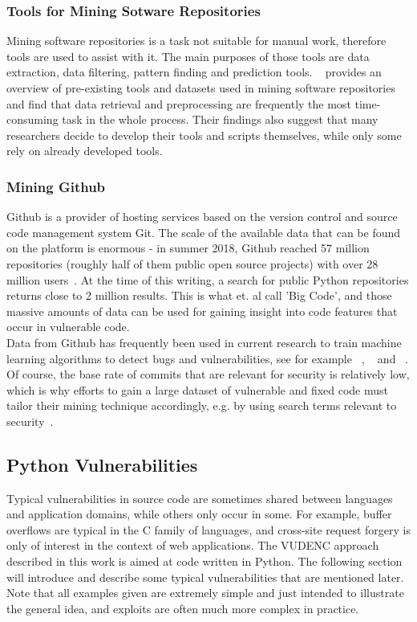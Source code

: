 \documentclass[
	a4paper,
	pagesize,
	pdftex,
	12pt,
	twoside, %
	BCOR=5mm, %
	ngerman,
	fleqn,
	final,
	]{scrartcl}
\begin{document}
\subsubsection{Tools for Mining Sotware Repositories}
Mining software repositories is a task not suitable for manual work, therefore tools are used to assist with it. The main purposes of those tools are data extraction, data filtering, pattern finding and prediction tools. ~\cite{Chaturvedi.2013} provides an overview of pre-existing tools and datasets used in mining software repositories and find that data retrieval and preprocessing are frequently the most time-consuming task in the whole process. Their findings also suggest that many researchers decide to develop their tools and scripts themselves, while only some rely on already developed tools. 
\subsubsection{Mining Github}
Github is a provider of hosting services based on the version control and source code management system Git. The scale of the available data that can be found on the platform is enormous - in summer 2018, Github reached 57 million repositories (roughly half of them public open source projects) with over 28 million users~\cite{Github.com.b}. At the time of this writing, a search for public Python repositories returns close to 2 million results. This is what \cite{Allamanis.2018} et. al call 'Big Code', and those massive amounts of data can be used for gaining insight into code features that occur in vulnerable code.\\
Data from Github has frequently been used in current research to train machine learning algorithms to detect bugs and vulnerabilities, see for example ~\cite{Zhou.2017}, ~\cite{Russell.2018} and ~\cite{Liu.2018}. Of course, the base rate of commits that are relevant for security is relatively low, which is why efforts to gain a large dataset of vulnerable and fixed code must tailor their mining technique accordingly, e.g. by using search terms relevant to security~\cite{Zhou.2017}.

\subsection{Python Vulnerabilities}

Typical vulnerabilities in source code are sometimes shared between languages and application domains, while others only occur in some. For example, buffer overflows are typical in the C family of languages, and cross-site request forgery is only of interest in the context of web applications. The VUDENC approach described in this work is aimed at code written in Python. The following section will introduce and describe some typical vulnerabilities that are mentioned later. Note that all examples given are extremely simple and just intended to illustrate the general idea, and exploits are often much more complex in practice.
\end{document}
